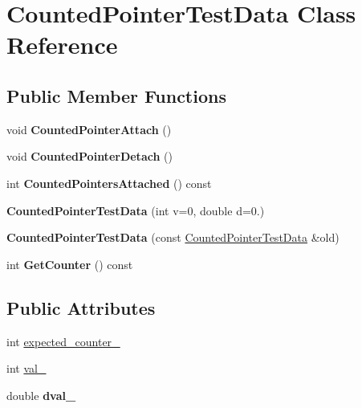 \hypertarget{classCountedPointerTestData}{}\section{Counted\+Pointer\+Test\+Data Class Reference}
\label{classCountedPointerTestData}
\subsection*{Public Member Functions}
\begin{DoxyCompactItemize}
\item 
\mbox{\label{classCountedPointerTestData_ab66d7ad27eafd7e7cc750140cf0bc843}} 
void {\bfseries Counted\+Pointer\+Attach} ()
\item 
\mbox{\label{classCountedPointerTestData_ae3d02226c1bf793ebec8b9200f469ebc}} 
void {\bfseries Counted\+Pointer\+Detach} ()
\item 
\mbox{\label{classCountedPointerTestData_ab2f64c85a2b1d6caa69afaee6182de78}} 
int {\bfseries Counted\+Pointers\+Attached} () const
\item 
\mbox{\label{classCountedPointerTestData_af586679534e19e10052e5590ba5fc6d7}} 
{\bfseries Counted\+Pointer\+Test\+Data} (int v=0, double d=0.)
\item 
\mbox{\label{classCountedPointerTestData_a291959434d7a5bab09417502959e618c}} 
{\bfseries Counted\+Pointer\+Test\+Data} (const \hyperlink{classCountedPointerTestData}{Counted\+Pointer\+Test\+Data} \&old)
\item 
\mbox{\label{classCountedPointerTestData_a6899d32976a44ffb5eb7e415d0e1c0de}} 
int {\bfseries Get\+Counter} () const
\end{DoxyCompactItemize}
\subsection*{Public Attributes}
\begin{DoxyCompactItemize}
\item 
int \hyperlink{classCountedPointerTestData_a1f4fb3bcde03506e7e4e9fee0e7d71c1}{expected\+\_\+counter\+\_\+}
\item 
int \hyperlink{classCountedPointerTestData_acb6b2ee120f84c5bf1ff4c590dd7d8c1}{val\+\_\+}
\item 
\mbox{\label{classCountedPointerTestData_a3bc0b2aa198523bc1050cdcc4d46a7ae}} 
double {\bfseries dval\+\_\+}
\end{DoxyCompactItemize}


